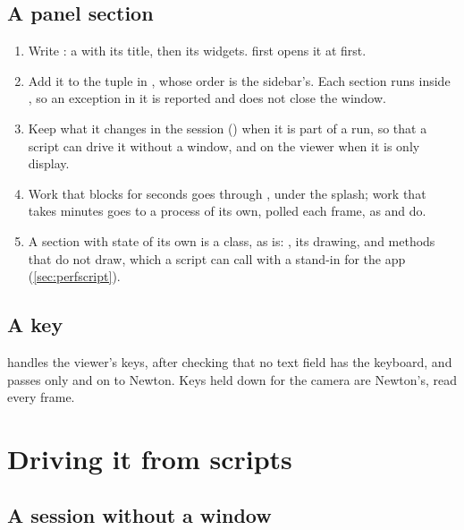 \subsection{A panel section}\label{sec:newsection}

\begin{enumerate}
\item Write : a  with its title, then its widgets.  first opens it at first.
\item Add it to the tuple in , whose order is the sidebar's. Each section runs inside , so an exception in it is reported and does not close the window.
\item Keep what it changes in the session () when it is part of a run, so that a script can drive it without a window, and on the viewer when it is only display.
\item Work that blocks for seconds goes through , under the splash; work that takes minutes goes to a process of its own, polled each frame, as  and  do.
\item A section with state of its own is a class, as  is: , its  drawing, and methods that do not draw, which a script can call with a stand-in for the app (\cref{sec:perfscript}).
\end{enumerate}

\subsection{A key}\label{sec:newkey}

 handles the viewer's keys, after checking that no text field has the keyboard, and passes only  and  on to Newton. Keys held down for the camera are Newton's, read every frame.

\section{Driving it from scripts}\label{sec:scripts}

\subsection{A session without a window}\label{sec:headless}

